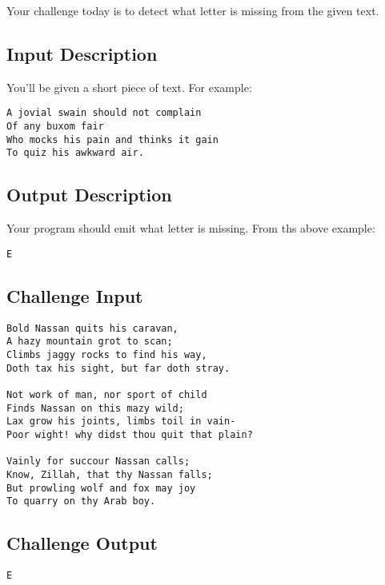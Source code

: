 Your challenge today is to detect what letter is missing from the given
text.

\subsection*{Input Description}\label{input-description-23}

You'll be given a short piece of text. For example:

\begin{lstlisting}
A jovial swain should not complain
Of any buxom fair
Who mocks his pain and thinks it gain
To quiz his awkward air.
\end{lstlisting}

\subsection*{Output Description}\label{output-description-24}

Your program should emit what letter is missing. From ths above example:

\begin{lstlisting}
E
\end{lstlisting}

\subsection*{Challenge Input}\label{challenge-input-25}

\begin{lstlisting}
Bold Nassan quits his caravan,
A hazy mountain grot to scan;
Climbs jaggy rocks to find his way,
Doth tax his sight, but far doth stray.

Not work of man, nor sport of child
Finds Nassan on this mazy wild;
Lax grow his joints, limbs toil in vain-
Poor wight! why didst thou quit that plain?

Vainly for succour Nassan calls;
Know, Zillah, that thy Nassan falls;
But prowling wolf and fox may joy
To quarry on thy Arab boy.
\end{lstlisting}

\subsection*{Challenge Output}\label{challenge-output-22}

\begin{lstlisting}
E
\end{lstlisting}

